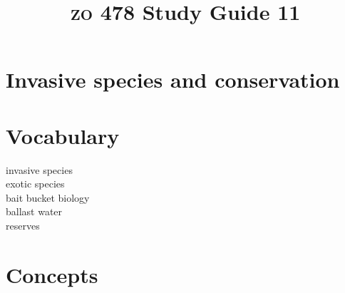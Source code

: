 \documentclass[letterpaper]{tufte-handout}
\title{{\scshape zo} 478 Study Guide 11}
\date{} %
\begin{document}
\maketitle	%

\section*{Invasive species and conservation}


\section{Vocabulary} 
\vspace{-1\baselineskip}
\begin{multicols}{2}
invasive species \\
exotic species \\
bait bucket biology \\
ballast water \\
reserves 
\end{multicols}

\section{Concepts}
\end{document}
